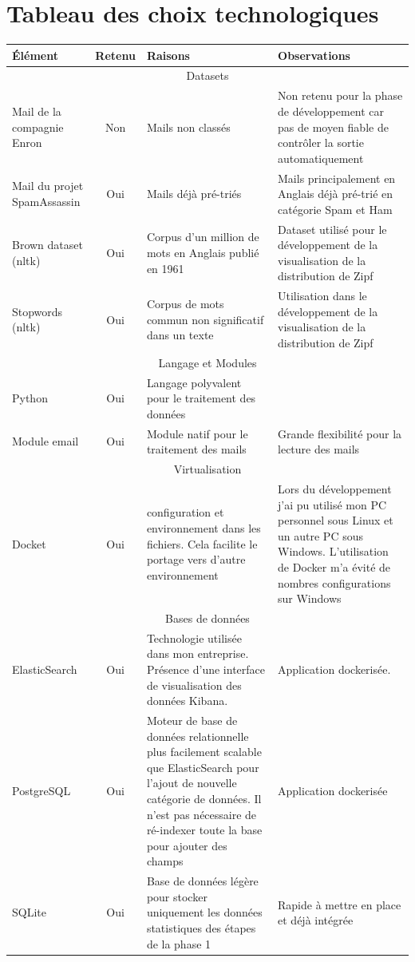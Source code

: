 \documentclass[a4paper,12pt]{article}
\begin{document}
\section{Tableau des choix technologiques}
	\begin{tabular}{|p{3cm}|c|p{4cm}|p{6cm}|}
		\hline
		Élément & Retenu & Raisons & Observations \\
		\hline
		
		\multicolumn{4}{|c|}{Datasets} \\
		\hline
		Mail de la compagnie Enron & Non & Mails non classés & Non retenu pour la phase de développement car pas de moyen fiable de contrôler la sortie automatiquement \\
		\hline
		Mail du projet SpamAssassin & Oui & Mails déjà pré-triés & Mails principalement en Anglais déjà pré-trié en catégorie Spam et Ham \\
		\hline
		Brown dataset (nltk) & Oui & Corpus d'un million de mots en Anglais publié en 1961 & Dataset utilisé pour le développement de la visualisation de la distribution de Zipf\\
		\hline
		Stopwords (nltk) & Oui & Corpus de mots commun non significatif dans un texte & Utilisation dans le développement de la visualisation de la distribution de Zipf\\
		\hline
		
		\multicolumn{4}{|c|}{Langage et Modules} \\
		\hline
		Python & Oui & Langage polyvalent pour le traitement des données & \\		
		\hline
		Module email & Oui & Module natif pour le traitement des mails & Grande flexibilité pour la lecture des mails \\
		\hline
		
		\multicolumn{4}{|c|}{Virtualisation} \\
		\hline
		Docket & Oui & configuration et environnement dans les fichiers. Cela facilite le portage vers d'autre environnement & Lors du développement j'ai pu utilisé mon PC personnel sous Linux et un autre PC sous Windows. L'utilisation de Docker m'a évité de nombres configurations sur Windows\\
		\hline
		
		\multicolumn{4}{|c|}{Bases de données} \\
		\hline
		ElasticSearch & Oui & Technologie utilisée dans mon entreprise. Présence d'une interface de visualisation des données Kibana. & Application dockerisée. \\
		\hline
		PostgreSQL & Oui & Moteur de base de données relationnelle plus facilement scalable que ElasticSearch pour l'ajout de nouvelle catégorie de données. Il n'est pas nécessaire de ré-indexer toute la base pour ajouter des champs & Application dockerisée\\
		\hline
		SQLite & Oui & Base de données légère pour stocker uniquement les données statistiques des étapes de la phase 1 & Rapide à mettre en place et déjà intégrée \\
		\hline		
		
		\hline
	\end{tabular}
	
\end{document}
